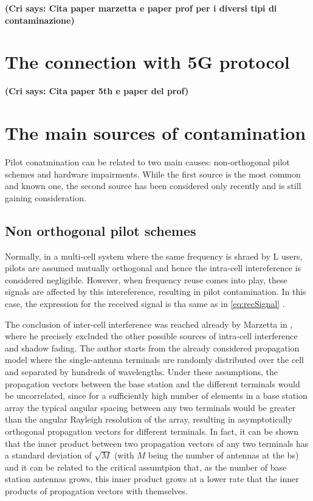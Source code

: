 \documentclass[11pt]{book}
\newcommand{\cri}[1]{\textcolor{MyColor2}{\textbf{(Cri says: #1)}}}
\begin{document}
\cri{Cita paper marzetta e paper prof per i diversi tipi di contaminazione}
\section{The connection with 5G protocol}
\cri{Cita paper 5th e paper del prof}
\section{The main sources of contamination}
Pilot conatmination can be related to two main causes: non-orthogonal pilot schemes and hardware impairments.
While the first source is the most common and known one, the second source has been considered only recently and is still gaining consideration.

\subsection{Non orthogonal pilot schemes}
Normally, in a multi-cell system where the same frequency is shraed by L users, pilots are assumed mutually orthogonal and hence the intra-cell intereference is considered negligible. However, when frequency reuse comes into play, these signals are affected by this intereference, resulting in pilot contamination. In this case, the expression for the received signal is tha same as in \ref{eq:recSignal} \cite{Elijah2016}.

The conclusion of inter-cell interference was reached already by Marzetta in \cite{Marzetta2010}, where he precisely excluded the other possible sources of intra-cell interference and shadow fading. The author starts from the already considered propagation model where the single-antenna terminals are randomly distributed over the cell and separated by hundreds of wavelengths. Under these assumptions, the propagation vectors between the base station and the different terminals would be uncorrelated, since for a sufficiently high number of elements in a base station array the typical angular spacing between any two terminals would be greater than the angular Rayleigh resolution of the array, resulting in asymptotically orthogonal propagation vectors for different terminals. In fact, it can be shown that the inner product between two propagation vectors of any two terminals has a standard deviation of $\sqrt{M}$ (with $M$ being the number of antennas at the \gls{bs}) and it can be related to the critical assumtpion that, as the number of base station antennas grows, this inner product grows at a lower rate that the inner products of propagation vectors with themselves.
\end{document}
